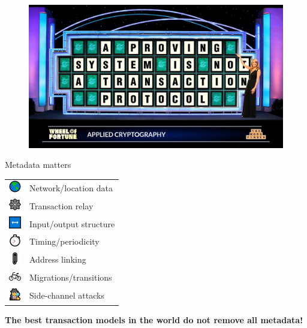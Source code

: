 \documentclass[aspectratio=169]{beamer}
\begin{document}
\begin{frame}
\begin{figure}
\includegraphics[width=\textwidth]{puzzle.jpeg}
\end{figure}
\end{frame}


\begin{frame}{Metadata matters}
\begin{table}
\centering
\begin{tabular}{>{\arraybackslash}m{0.3in} >{\arraybackslash}m{2.0in}}
\includegraphics[width=20px]{icon-earth.png} & Network/location data \\
\includegraphics[width=20px]{icon-web.png} & Transaction relay \\
\includegraphics[width=20px]{icon-arrows.png} & Input/output structure \\
\includegraphics[width=20px]{icon-stopwatch.png} & Timing/periodicity \\
\includegraphics[width=20px]{icon-clip.png} & Address linking \\
\includegraphics[width=20px]{icon-bike.png} & Migrations/transitions \\
\includegraphics[width=20px]{icon-spy.png} & Side-channel attacks
\end{tabular}
\end{table}

\begin{center}
\textbf{The best transaction models in the world do not remove all metadata!}
\end{center}
\end{frame}
\end{document}

